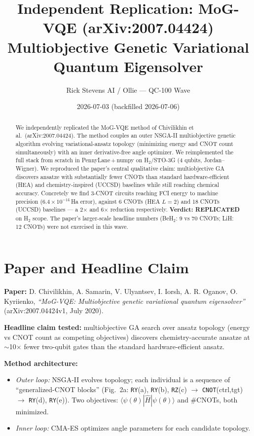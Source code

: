 \documentclass[11pt]{article}
\title{Independent Replication: MoG-VQE (arXiv:2007.04424)\\
\large Multiobjective Genetic Variational Quantum Eigensolver}
\author{Rick Stevens AI / Ollie --- QC-100 Wave}
\date{2026-07-03 (backfilled 2026-07-06)}
\begin{document}
\maketitle

\begin{abstract}
We independently replicated the MoG-VQE method of Chivilikhin et al.\ (arXiv:2007.04424).
The method couples an outer NSGA-II multiobjective genetic algorithm evolving
variational-ansatz topology (minimizing energy and CNOT count simultaneously) with
an inner derivative-free angle optimizer. We reimplemented the full stack from scratch
in PennyLane\,+\,numpy on H$_2$/STO-3G (4 qubits, Jordan--Wigner). We reproduced
the paper's central qualitative claim: multiobjective GA discovers ansatze with
substantially fewer CNOTs than standard hardware-efficient (HEA) and chemistry-inspired
(UCCSD) baselines while still reaching chemical accuracy. Concretely we find
3-CNOT circuits reaching FCI energy to machine precision ($6.4\times10^{-14}$\,Ha error),
against 6 CNOTs (HEA $L=2$) and 18 CNOTs (UCCSD) baselines --- a 2$\times$ and 6$\times$
reduction respectively. \textbf{Verdict: REPLICATED} on H$_2$ scope. The paper's larger-scale
headline numbers (BeH$_2$: 9 vs 70 CNOTs; LiH: 12 CNOTs) were not exercised in this wave.
\end{abstract}

\section{Paper and Headline Claim}

\textbf{Paper:} D. Chivilikhin, A. Samarin, V. Ulyantsev, I. Iorsh, A. R. Oganov, O. Kyriienko,
\emph{``MoG-VQE: Multiobjective genetic variational quantum eigensolver''}
(arXiv:2007.04424v1, July 2020).

\textbf{Headline claim tested:} multiobjective GA search over ansatz topology (energy vs
CNOT count as competing objectives) discovers chemistry-accurate ansatze at
$\sim$10$\times$ fewer two-qubit gates than the standard hardware-efficient ansatz.

\textbf{Method architecture:}
\begin{itemize}
  \item \emph{Outer loop:} NSGA-II evolves topology; each individual is a sequence
    of ``generalized-CNOT blocks'' (Fig.~2a: \texttt{RY}(a), \texttt{RY}(b), \texttt{RZ}(c)
    $\to$ \texttt{CNOT}(ctrl,tgt) $\to$ \texttt{RY}(d), \texttt{RY}(e)).
    Two objectives: $\langle\psi(\theta)|\hat{H}|\psi(\theta)\rangle$ and \#CNOTs, both minimized.
  \item \emph{Inner loop:} CMA-ES optimizes angle parameters for each candidate topology.
\end{itemize}
\end{document}
